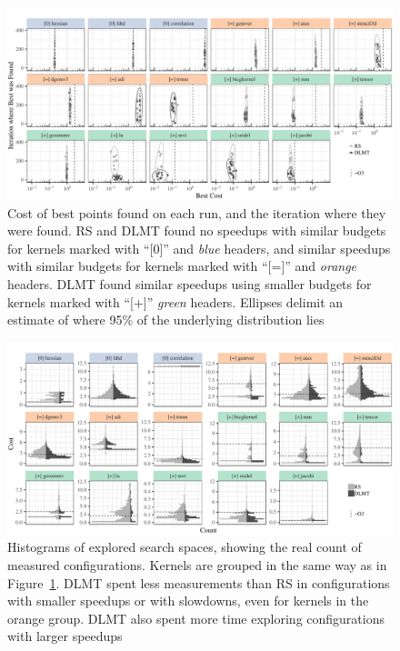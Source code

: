 \documentclass[conference]{IEEEtran}
\begin{document}
\begin{figure}[p]
\centering
\includegraphics[width=\textwidth]{./img/iteration_best_comparison.pdf}
\caption{\label{fig:org8b13504}
Cost of best points found on each run, and the iteration where they were found. RS and DLMT found no speedups with similar budgets for kernels marked with ``[0]'' and \emph{blue} headers, and similar speedups with similar budgets for kernels marked with ``[=]'' and \emph{orange} headers. DLMT found similar speedups using smaller budgets for kernels marked with ``[+]'' \emph{green} headers. Ellipses delimit an estimate of where 95\% of the underlying distribution lies}
\end{figure}

\begin{figure}[p]
\centering
\includegraphics[width=\textwidth]{./img/split_histograms.pdf}
\caption{\label{fig:orgc434cd9}
Histograms of explored search spaces, showing the real count of measured configurations. Kernels are grouped in the same way as in Figure~\ref{fig:org8b13504}. DLMT spent less measurements than RS in configurations with smaller speedups or with slowdowns, even for kernels in the orange group. DLMT also spent more time exploring configurations with larger speedups}
\end{figure}
\end{document}
